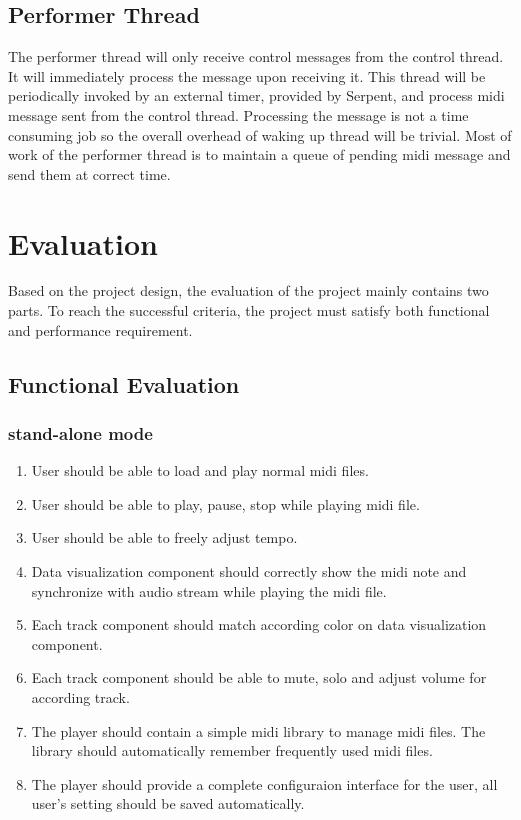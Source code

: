 \documentclass[12pt]{article} %
\begin{document}
\subsection{Performer Thread}
The performer thread will only receive control messages from the control thread. 
It will immediately process the message upon receiving it. This thread will be periodically invoked by 
an external timer, provided by Serpent, and process midi message sent from the control thread. 
Processing the message is not a time consuming job so the overall overhead of waking up 
thread will be trivial. Most of work of the performer thread is to maintain a queue of pending
midi message and send them at correct time.

\section{Evaluation}
Based on the project design, the evaluation of the project mainly contains two parts. To reach the
successful criteria, the project must satisfy both functional and performance requirement.

\subsection{Functional Evaluation}
\subsubsection{stand-alone mode}
\begin{enumerate}
  \item User should be able to load and play normal midi files.
  \item User should be able to play, pause, stop while playing midi file.  
  \item User should be able to freely adjust tempo.  
  \item Data visualization component should correctly show the midi note and synchronize with audio stream 
        while playing the midi file.
  \item Each track component should match according color on data visualization component.
  \item Each track component should be able to mute, solo and adjust volume for according track.  
  \item The player should contain a simple midi library to manage midi files. The library should automatically 
        remember frequently used midi files.
  \item The player should provide a complete configuraion interface for the user, all user's setting should 
        be saved automatically.
\end{enumerate}
\end{document}
